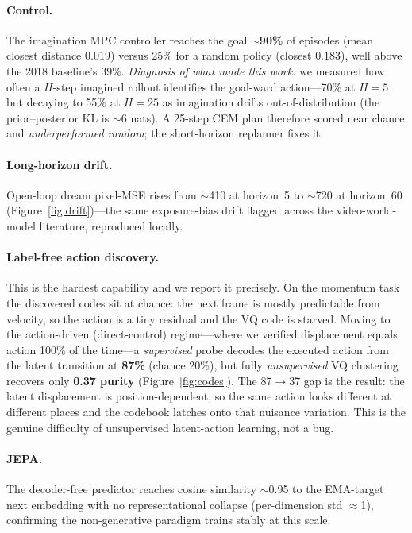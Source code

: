 \documentclass[11pt]{article}
\begin{document}
\paragraph{Control.} The imagination MPC controller reaches the goal \textbf{$\sim$90\%}
of episodes (mean closest distance $0.019$) versus 25\% for a random policy (closest
$0.183$), well above the 2018 baseline's 39\%. \emph{Diagnosis of what made this
work:} we measured how often a $H$-step imagined rollout identifies the goal-ward
action---70\% at $H{=}5$ but decaying to 55\% at $H{=}25$ as imagination drifts
out-of-distribution (the prior--posterior KL is $\sim$6 nats). A 25-step CEM plan
therefore scored near chance and \emph{underperformed random}; the short-horizon
replanner fixes it.

\paragraph{Long-horizon drift.} Open-loop dream pixel-MSE rises from $\sim$410 at
horizon~5 to $\sim$720 at horizon~60 (Figure~\ref{fig:drift})---the same
exposure-bias drift flagged across the video-world-model literature, reproduced
locally.

\paragraph{Label-free action discovery.} This is the hardest capability and we
report it precisely. On the momentum task the discovered codes sit at chance: the
next frame is mostly predictable from velocity, so the action is a tiny residual and
the VQ code is starved. Moving to the action-driven (direct-control) regime---where
we verified displacement equals action 100\% of the time---a \emph{supervised} probe
decodes the executed action from the latent transition at \textbf{87\%} (chance
20\%), but fully \emph{unsupervised} VQ clustering recovers only
\textbf{0.37 purity} (Figure~\ref{fig:codes}). The 87$\to$37 gap is the result: the
latent displacement is position-dependent, so the same action looks different at
different places and the codebook latches onto that nuisance variation. This is the
genuine difficulty of unsupervised latent-action learning, not a bug.

\paragraph{JEPA.} The decoder-free predictor reaches cosine similarity $\sim$0.95 to
the EMA-target next embedding with no representational collapse (per-dimension
std $\approx$1), confirming the non-generative paradigm trains stably at this scale.
\end{document}
